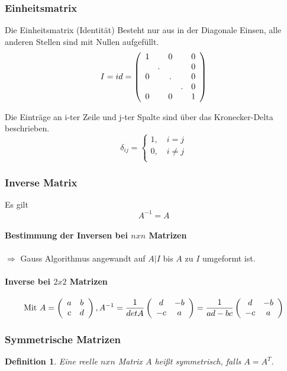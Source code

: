 \documentclass[12pt,a4paper]{report}%
\newtheorem{definition}[satz]{Definition}
\numberwithin{equation}{section}
\newcommand{\subsubsubsection}{\paragraph}
\def\mzxz#1#2#3#4{\left(\begin{array}{c c} #1 & #2 \\ #3 & #4 \\ \end{array}\right)}
\numberwithin{equation}{subsection}
\begin{document}
  \subsubsection{Einheitsmatrix}
  Die Einheitsmatrix (Identität) Besteht nur aus in der Diagonale Einsen, alle anderen Stellen sind mit Nullen aufgefüllt.
  \begin{equation}
    I = id = \left(\begin{array}{c c c c c}
    1 & \; &  0 & \; & 0\\
    \;& .  & \; & \; & 0\\
    0 & \; &  . & \; & 0\\
    \;& \; & \; & .  & 0\\
    0 & \;  & 0 & \; & 1\\
    \end{array}\right)
  \end{equation}
  
  Die Einträge an i-ter Zeile und j-ter Spalte sind über das Kronecker-Delta beschrieben.
  \begin{equation}
    \delta_{ij} = \begin{cases}
	    1,\quad i = j\\
	    0,\quad i\neq j\\
    \end{cases}
  \end{equation}
  
  \subsubsection{Inverse Matrix}
  Es gilt
  \begin{equation}
    A^{-1} = A
  \end{equation}
  \subsubsubsection{Bestimmung der Inversen bei $nxn$ Matrizen}
    $\Rightarrow$ Gauss Algorithmus angewandt auf $A|I$ bis $A$ zu $I$ umgeformt ist.
  \subsubsubsection{Inverse bei $2x2$ Matrizen}
    \begin{equation}
    \text{Mit } A = \left(\begin{array}{c c} a & b \\ c & d \\ \end{array}\right), A^{-1} = \frac{1}{detA} \mzxz{d}{-b}{-c}{a} = \frac{1}{ad-bc} \mzxz{d}{-b}{-c}{a}
    \end{equation}
    
   \subsubsection{Symmetrische Matrizen}
   \begin{definition}
     Eine reelle $nxn$ Matrix $A$ heißt symmetrisch, falls $A = A^T$.
   \end{definition}
   
\end{document}

